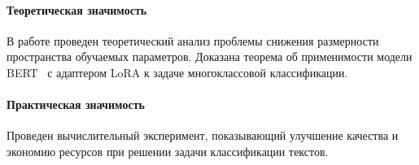\paragraph{Теоретическая значимость}
В работе проведен теоретический анализ проблемы снижения размерности пространства обучаемых параметров. Доказана теорема об применимости модели BERT~\cite{vaswani2017attention} с адаптером LoRA к задаче многоклассовой классификации. 

\paragraph{Практическая значимость}
Проведен вычислительный эксперимент, показывающий улучшение качества и экономию ресурсов при решении задачи классификации текстов.